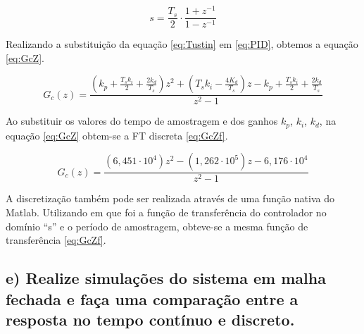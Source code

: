         \begin{equation}
            s = \frac{T_s}{2} \cdot \frac{1+z^{-1}}{1-z^{-1}}
            \label{eq:Tustin}
        \end{equation}

        Realizando a substituição da equação \ref{eq:Tustin} em \ref{eq:PID}, obtemos a equação \ref{eq:GcZ}.
        
        \begin{equation}
            G_c(z) = \frac{(k_p+\frac{T_sk_i}{2}+\frac{2k_d}{T_s})z^2 + (T_sk_i-\frac{4K_d}{T_s})z - k_p + \frac{T_sk_i}{2} + \frac{2k_d}{T_s}}
            {z^2-1}
            \label{eq:GcZ}
        \end{equation}

        Ao substituir os valores do tempo de amostragem e dos ganhos $k_p$, $k_i$, $k_d$, na equação \ref{eq:GcZ} obtem-se a
        FT discreta \ref{eq:GcZf}.

        \begin{equation}
            G_c(z) = \frac{(6,451 \cdot 10^4)z^2 - (1,262 \cdot 10^5)z - 6,176 \cdot 10^4}{z^2-1}
            \label{eq:GcZf}
        \end{equation}
        
        A discretização também pode ser realizada através de uma função  nativa do Matlab. Utilizando 
         em que  foi a função de transferência do controlador no domínio ``s'' e 
        o período de amostragem, obteve-se a mesma função de transferência \ref{eq:GcZf}.



    \subsection*{e) Realize simulações do sistema em malha fechada e faça uma comparação entre a resposta no tempo contínuo e discreto.}
    
        